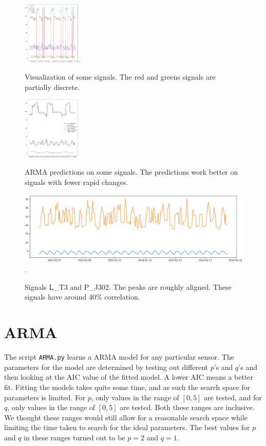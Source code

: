 \documentclass[]{article}
\begin{document}
\begin{center}
\begin{figure}[H]
\begin{minipage}{.5\textwidth}
  \includegraphics[width=1\linewidth, height=3cm]{./visuallizations/signals.png}
  \caption{Visualization of some signals. The red and greens signals are partially discrete.}
  \label{signals}
\end{minipage} %
\begin{minipage}{.5\textwidth}
  \includegraphics[width=1\linewidth, height=3cm]{./visuallizations/predictions.png}
   \caption{ARMA predictions on some signals. The predictions work better on signals with fewer rapid changes.}
  \label{predictions}
\end{minipage}
\begin{minipage}{.5\textwidth}
  \includegraphics[width=2\linewidth, height=3.5cm]{./visuallizations/correlated_signals.png}.
  \label{correlation}
  \caption{Signals L\_T3 and P\_J302. The peaks are roughly aligned. These signals have around 40\% correlation.}
\end{minipage}%
\end{figure}
\end{center}

\clearpage
\section{ARMA}
The script \texttt{ARMA.py} learns a ARMA model for any particular sensor. The parameters for the model are determined by testing out different $p$'s and $q$'s and then looking at the AIC value of the fitted model. A lower AIC means a better fit. Fitting the models takes quite some time, and as such the search space for parameters is limited. For $p$, only values in the range of $[0, 5]$ are tested, and for $q$, only values in the range of $[0, 5]$ are tested. Both these ranges are inclusive. We thought these ranges would still allow for a reasonable search space while limiting the time taken to search for the ideal parameters. The best values for $p$ and $q$ in these ranges turned out to be $p = 2$ and $q  = 1$. 
\end{document}
